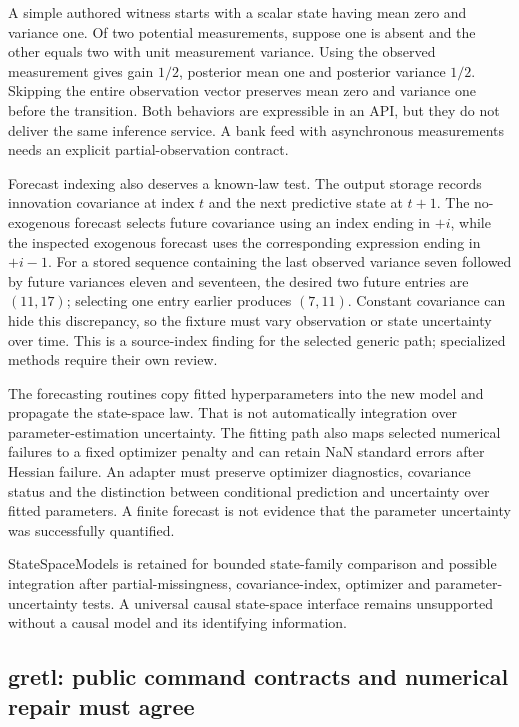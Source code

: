 A simple authored witness starts with a scalar state having mean zero and variance one. Of two potential measurements, suppose one is absent and the other equals two with unit measurement variance. Using the observed measurement gives gain $1/2$, posterior mean one and posterior variance $1/2$. Skipping the entire observation vector preserves mean zero and variance one before the transition. Both behaviors are expressible in an API, but they do not deliver the same inference service. A bank feed with asynchronous measurements needs an explicit partial-observation contract.~\citep{exec25_odyn_ssm,exec25_odyn_choice}

Forecast indexing also deserves a known-law test. The output storage records innovation covariance at index $t$ and the next predictive state at $t+1$. The no-exogenous forecast selects future covariance using an index ending in $+i$, while the inspected exogenous forecast uses the corresponding expression ending in $+i-1$. For a stored sequence containing the last observed variance seven followed by future variances eleven and seventeen, the desired two future entries are $(11,17)$; selecting one entry earlier produces $(7,11)$. Constant covariance can hide this discrepancy, so the fixture must vary observation or state uncertainty over time. This is a source-index finding for the selected generic path; specialized methods require their own review.~\citep{exec25_odyn_ssm,exec25_odyn_choice}

The forecasting routines copy fitted hyperparameters into the new model and propagate the state-space law. That is not automatically integration over parameter-estimation uncertainty. The fitting path also maps selected numerical failures to a fixed optimizer penalty and can retain NaN standard errors after Hessian failure. An adapter must preserve optimizer diagnostics, covariance status and the distinction between conditional prediction and uncertainty over fitted parameters. A finite forecast is not evidence that the parameter uncertainty was successfully quantified.

StateSpaceModels is retained for bounded state-family comparison and possible integration after partial-missingness, covariance-index, optimizer and parameter-uncertainty tests. A universal causal state-space interface remains unsupported without a causal model and its identifying information.~\citep{exec25_odyn_ssm,exec25_odyn_choice}

\subsection{gretl: public command contracts and numerical repair must agree}

